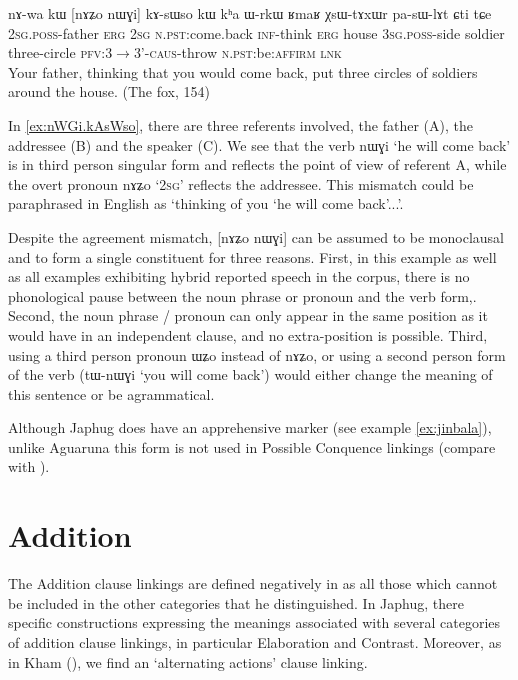 \documentclass[oldfontcommands,oneside,a4paper,11pt]{article}
\newcommand{\ipa}[1]{{\phon \mbox{#1}}} %
\begin{document}
  \begin{exe}
\ex \label{ex:nWGi.kAsWso}
\gll 
\ipa{nɤ-wa}  	\ipa{kɯ}  	[\ipa{nɤʑo}  	\ipa{nɯɣi}]  	\ipa{kɤ-sɯso}  	\ipa{kɯ}  	\ipa{kʰa}  	\ipa{ɯ-rkɯ}  	\ipa{ʁmaʁ}  	\ipa{χsɯ-tɤxɯr}  	\ipa{pa-sɯ-lɤt}  	\ipa{ɕti}  	\ipa{tɕe}  \\
\textsc{2sg.poss}-father \textsc{erg} \textsc{2sg} \textsc{n.pst}:come.back  \textsc{inf}-think \textsc{erg} house \textsc{3sg.poss}-side soldier three-circle \textsc{pfv:3$\rightarrow$3'-caus}-throw \textsc{n.pst}:be:\textsc{affirm} \textsc{lnk}\\
\glt Your father, thinking that you would come back,   put three circles of soldiers around the house. (The fox, 154)

 \end{exe}
 
In \ref{ex:nWGi.kAsWso}, there are three referents involved, the father (A), the addressee (B) and the speaker (C). We see that the verb  	\ipa{nɯɣi} `he will come back' is in third person singular form and reflects the point of view of referent A, while the overt pronoun \ipa{nɤʑo} `\textsc{2sg}' reflects the addressee. This mismatch could be paraphrased in English as `thinking of you `he will come back'...'.  

Despite the agreement mismatch, 	[\ipa{nɤʑo}  	\ipa{nɯɣi}] can be assumed to be monoclausal and to form a single constituent for three reasons. First, in this example as well as all examples exhibiting   hybrid reported speech in the corpus, there is no phonological pause between the noun phrase or pronoun and the verb form,. Second,  the noun phrase / pronoun can only appear in the same position as it would have in an independent clause, and no extra-position is possible. Third, using a third person pronoun \ipa{ɯʑo} instead of \ipa{nɤʑo}, or using a second person form of the verb (\ipa{tɯ-nɯɣi} `you will come back') would either change the meaning of this sentence or be agrammatical.
 
Although Japhug does have an apprehensive marker (see example \ref{ex:jinbala}), unlike Aguaruna this form is not used in Possible Conquence linkings  (compare with \citealt[187]{overall09linking}). 


\section{Addition}
The Addition clause linkings are defined negatively in \citet[26]{dixon09intro} as all those which cannot be included in the other categories that he distinguished. In Japhug,    there   specific constructions   expressing the meanings associated with several categories of addition clause linkings, in particular Elaboration and Contrast. Moreover, as in Kham (\citealt[113]{watters09kham}), we find an `alternating actions' clause linking.
\end{document}
